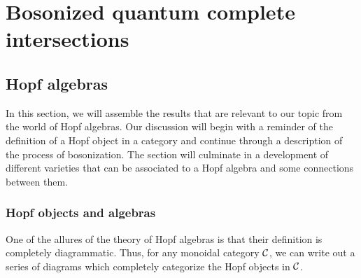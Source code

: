 \documentclass [11pt, proquest] {uwthesis}[2020/02/24]
\begin{document}
 
 


\part{Bosonized quantum complete intersections}\label{prt:bqci}

\chapter{Hopf algebras}
    In this section, we will assemble the results that are relevant to our topic from the world of Hopf algebras. Our discussion will begin with a reminder of the definition of a Hopf object in a category and continue through a description of the process of bosonization. The section will culminate in a development of different varieties that can be associated to a Hopf algebra and some connections between them.

\section{Hopf objects and algebras}
    One of the allures of the theory of Hopf algebras is that their definition is completely diagrammatic. Thus, for any monoidal category $\mathcal{C}$, we can write out a series of diagrams which completely categorize the Hopf objects in $\mathcal{C}$.
\end{document}
